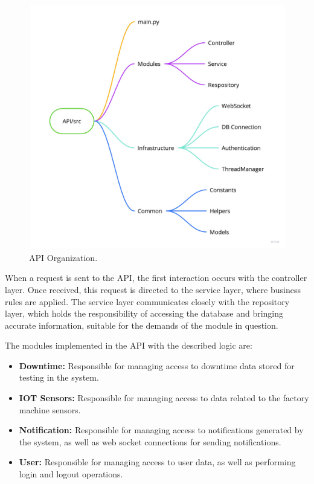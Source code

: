 \begin{figure}[htbp]
	\centering
	\includegraphics[scale=0.1]{images/API_Organization.jpg}
	\caption{API Organization.}
	\label{fig:api_organization}
\end{figure}

When a request is sent to the \gls{API}, the first interaction occurs with the controller layer. Once received, this request is directed to the service layer, where business rules are applied. The service layer communicates closely with the repository layer, which holds the responsibility of accessing the database and bringing accurate information, suitable for the demands of the module in question.

The modules implemented in the \gls{API} with the described logic are:
\begin{itemize}
	\item \textbf{Downtime:} Responsible for managing access to downtime data stored for testing in the system.
	\item \textbf{IOT Sensors:} Responsible for managing access to data related to the factory machine sensors.
	\item \textbf{Notification:} Responsible for managing access to notifications generated by the system, as well as web socket connections for sending notifications.
	\item \textbf{User:} Responsible for managing access to user data, as well as performing login and logout operations. 
\end{itemize}

